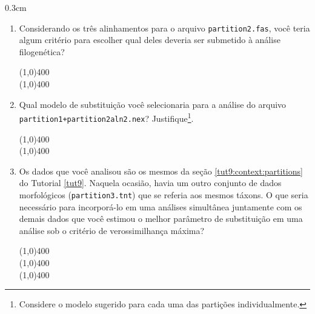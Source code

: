 \begin{refsection}
\begin {myindentpar}{0.3cm}
\begin{enumerate}[\itshape i.]
\begin{center}
\line(1,0){400}\\
\line(1,0){400}\\
\end{center}

	\item{Considerando os três alinhamentos para o arquivo \texttt{partition2.fas}, você teria algum critério para escolher qual deles deveria ser submetido à análise filogenética?}

\begin{center}
\line(1,0){400}\\
\line(1,0){400}\\

\end{center}

	\item{Qual modelo de substituição você selecionaria para a análise do arquivo \texttt{partition1+partition2aln2.nex}? Justifique\footnote{ Considere o modelo sugerido para cada uma das partições individualmente.}.}

\begin{center}
\line(1,0){400}\\
\line(1,0){400}\\
\end{center}

	\item{Os dados que você analisou são os mesmos da seção \ref{tut9:context:partitions} do Tutorial \ref{tut9}. Naquela ocasião, havia um outro conjunto de dados morfológicos (\texttt{partition3.tnt}) que se referia aos mesmos táxons. O que seria necessário para incorporá-lo em uma análises simultânea juntamente com os demais dados que você estimou o melhor parâmetro de substituição em uma análise sob o critério de verossimilhança máxima?}

\begin{center}
\line(1,0){400}\\
\line(1,0){400}\\
\line(1,0){400}\\
\end{center}

\end{enumerate}
\end{myindentpar}




\end{refsection}

